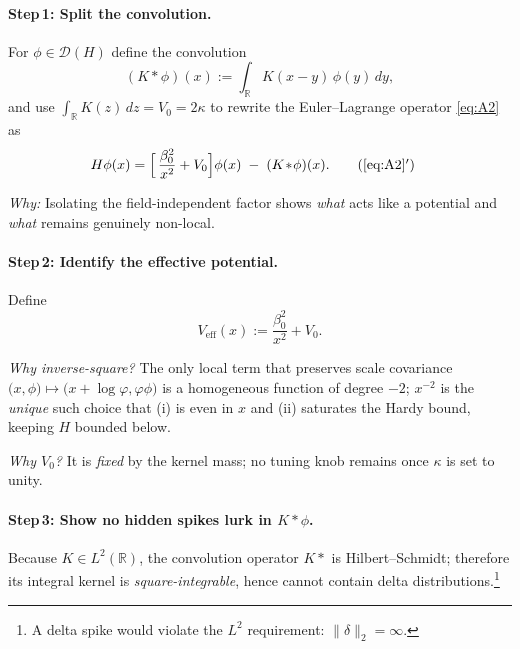 \documentclass[11pt]{article}
\begin{document}
\vspace{0.6em}
\paragraph{Step\,1: Split the convolution.}

For $\phi\in\mathcal D(H)$ define the convolution
\[
   (K\!\ast\!\phi)(x)
   :=\int_{\mathbb R} K(x-y)\,\phi(y)\,dy,
\]
and use $\int_{\mathbb R}K(z)\,dz = V_{0}=2\kappa$ to rewrite
the Euler–Lagrange operator \eqref{eq:A2} as
\begin{align}
   H\phi(x)
   &=
   \Bigl[\,
      \frac{\beta_{0}^{2}}{x^{2}} + V_{0}
   \Bigr]\phi(x)
   \;-\;(K\!\ast\!\phi)(x).
   \tag{\ref{eq:A2}${}'$}
\end{align}

\noindent
\emph{Why:}  Isolating the field-independent factor shows \emph{what}
acts like a potential and \emph{what} remains genuinely non-local.

\vspace{0.4em}
\paragraph{Step\,2: Identify the effective potential.}

Define
\[
   V_{\mathrm{eff}}(x)
   := \frac{\beta_{0}^{2}}{x^{2}} + V_{0}.
\]

\emph{Why inverse-square?}  
The only local term that preserves scale covariance
$\bigl(x,\phi\bigr)\!\mapsto\!\bigl(\!x+\log\varphi,\varphi\phi\bigr)$
is a homogeneous function of degree $-2$; 
$x^{-2}$ is the \emph{unique} such choice that (i) is even in $x$ and
(ii) saturates the Hardy bound, keeping $H$ bounded below.

\emph{Why $V_{0}$?}  
It is \emph{fixed} by the kernel mass; no tuning knob remains once
$\kappa$ is set to unity.

\vspace{0.4em}
\paragraph{Step\,3: Show no hidden spikes lurk in $K\!\ast\!\phi$.}

Because $K\in L^{2}(\mathbb R)$, the convolution operator
$K\!\ast$ is Hilbert–Schmidt; therefore its integral kernel
is \emph{square-integrable}, hence cannot contain delta
distributions.\footnote{A delta spike would violate
the $L^{2}$ requirement: $\|\delta\|_{2}=\infty$.}
\end{document}
